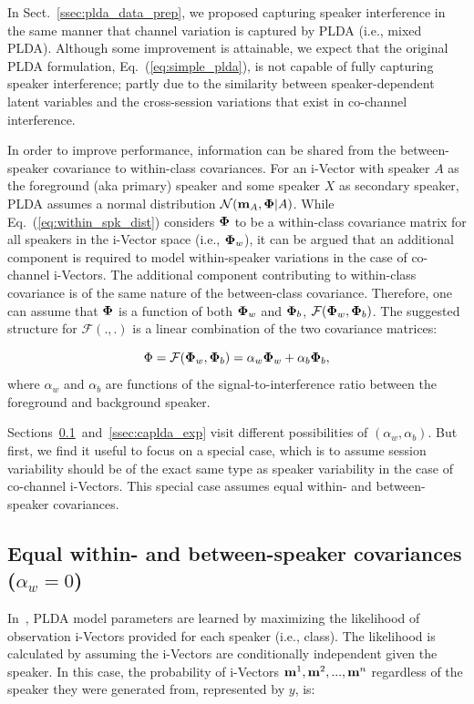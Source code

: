 In Sect.~\ref{ssec:plda_data_prep}, we proposed capturing speaker interference in the same manner that channel variation is captured by PLDA (i.e., mixed PLDA). 
Although some improvement is attainable, we expect that the original PLDA formulation, Eq.~(\ref{eq:simple_plda}), is not capable of fully capturing speaker interference; partly due to the similarity between speaker-dependent latent variables and the cross-session variations that exist in co-channel interference. 

In order to improve performance, information can be shared from the between-speaker covariance to within-class covariances. 
For an i-Vector with speaker $A$ as the foreground (aka primary) speaker and some speaker $X$ as secondary speaker, PLDA assumes a normal distribution $\mathcal{N} ({\bf m}_A,{\bf \Phi} | A)$. 
While Eq.~(\ref{eq:within_spk_dist}) considers ${\bf \Phi}$ to be a within-class covariance matrix for all speakers in the i-Vector space (i.e., ${\bf \Phi}_w$), it can be argued that an additional component is required to model within-speaker variations in the case of co-channel i-Vectors. 
The additional component contributing to within-class covariance is of the same nature of the between-class covariance. 
Therefore, one can assume that ${\bf \Phi}$ is a function of both ${\bf \Phi}_w$ and ${\bf \Phi}_b$, $ \mathcal{F} ({\bf \Phi}_w,{\bf \Phi}_b)$. 
The suggested structure for $ \mathcal{F} (.,.)$ is a linear combination of the two covariance matrices: 

\begin{equation}
\label{eq:complex_phiw}
\Phi = \mathcal{F} ({\bf \Phi}_w,{\bf \Phi}_b) = 
\alpha_w{\bf \Phi}_w + \alpha_b{\bf \Phi}_b,
\end{equation}
where $\alpha_w$ and $\alpha_b$ are functions of the signal-to-interference ratio between the foreground and background speaker. 

Sections~\ref{ssec:alpha_w_0}~and~\ref{ssec:caplda_exp} visit different possibilities of $(\alpha_w, \alpha_b)$. But first, we find it useful to focus on a special case, which is to assume session variability should be of the exact same type as speaker variability in the case of co-channel i-Vectors. 
This special case assumes equal within- and between-speaker covariances. 

\subsection{Equal within- and between-speaker covariances ($\alpha_w = 0$)}
\label{ssec:alpha_w_0}
In~\cite{ioffePLDA2006}, PLDA model parameters are learned by maximizing the likelihood of observation i-Vectors provided for each speaker (i.e., class). 
The likelihood is calculated by assuming the i-Vectors are conditionally independent given the speaker. 
In this case, the probability of i-Vectors ${\bf m}^1, {\bf m}^2, ..., {\bf m}^n$ regardless of the speaker they were generated from, represented by $y$, is:

